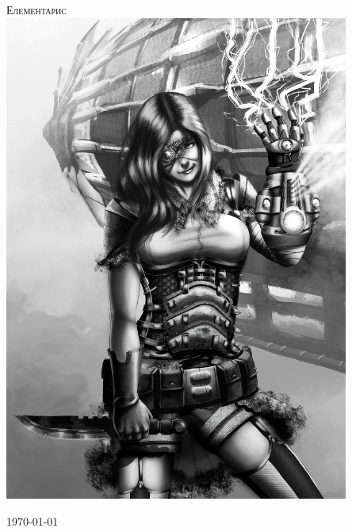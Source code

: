 \begin{titlepage}
\begin{center}

\textsc{\Huge Елементарис}\\[1.5cm]
\includegraphics[width=0.85\textwidth]{../images/steampunkA4}~
\\[1cm]

\vfill

\today

\end{center}
\end{titlepage}
